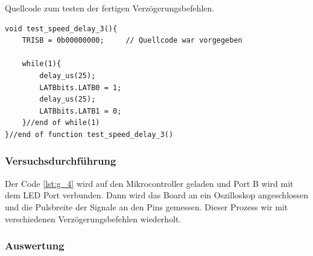 \documentclass[12pt,a4paper]{article}
\begin{document}
Quellcode zum testen der fertigen Verzögerungsbefehlen.

\lstset{language=C, basicstyle=\tiny}
\begin{lstlisting}[caption = {Geschwindigkeitstest mit den fertigen Verzögerungsbefehlen}, label=lst:g_4,captionpos=b]
void test_speed_delay_3(){
	TRISB = 0b00000000;		// Quellcode war vorgegeben
	
	while(1){
		delay_us(25);
		LATBbits.LATB0 = 1;
		delay_us(25);
		LATBbits.LATB1 = 0;
	}//end of while(1)
}//end of function test_speed_delay_3()
\end{lstlisting}



\subsubsection*{Versuchsdurchführung}

Der Code \ref{lst:g_4} wird auf den Mikrocontroller geladen und Port B wird mit dem LED Port verbunden. Dann wird das Board an ein Oszilloskop angeschlossen und die Pulsbreite der Signale an den Pins gemessen. Dieser Prozess wir mit verschiedenen Verzögerungsbefehlen wiederholt.


\subsubsection*{Auswertung}
\end{document}
